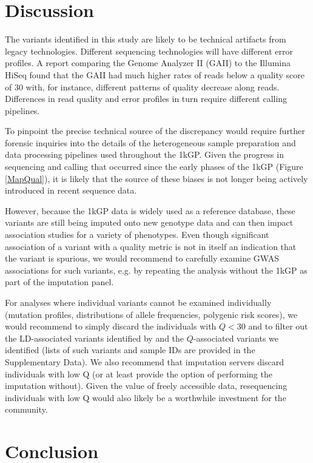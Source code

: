 \documentclass[9pt,lineno]{template}
\begin{document}
\section{Discussion}

The variants identified in this study are likely to be technical artifacts from legacy technologies.
Different sequencing technologies will have different error profiles. 
A report comparing the Genome Analyzer II (GAII) to the Illumina HiSeq found that the GAII had much higher rates of reads below a quality score of 30 \citep{Minoche2011} with, for instance, different patterns of quality decrease along reads. 
Differences in read quality and error profiles in turn require different calling pipelines.
 
To pinpoint the precise technical source of the discrepancy would require further forensic inquiries into the details of the heterogeneous sample preparation and data processing pipelines used throughout the 1kGP. 
Given the progress in sequencing and calling that occurred since the early phases of the 1kGP (Figure \ref{MapQual}), it is likely that the source of these biases is not longer being actively introduced in recent sequence data.

However, because the 1kGP data is widely used as a reference database, these variants are still being imputed onto new genotype data and can then impact association studies for a variety of phenotypes. 
Even though significant association of a variant with a quality metric is not in itself an indication that the variant is spurious, we would recommend to carefully examine GWAS associations for such variants, e.g. by repeating the analysis without the 1kGP as part of the imputation panel. 

For analyses where individual variants cannot be examined individually (mutation profiles, distributions of allele frequencies, polygenic risk scores), we would recommend to simply discard the individuals with $Q<30$ and to filter out the LD-associated variants identified by \cite{mafessoni2018turning} and the $Q$-associated variants we identified (lists of such variants and sample IDs are provided in the Supplementary Data). We also recommend that imputation servers discard individuals with low Q (or at least provide the option of performing the imputation without). Given the value of freely accessible data, resequencing individuals with low Q would  also likely be a worthwhile investment for the community. 

\section{Conclusion}
\end{document}
